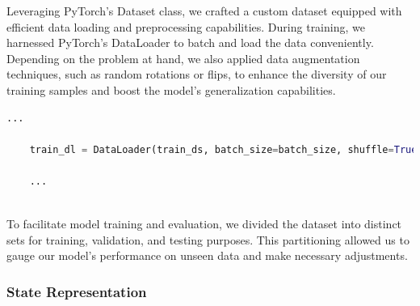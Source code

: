 Leveraging PyTorch's Dataset class, we crafted a custom dataset equipped with efficient data loading and preprocessing capabilities. 
During training, we harnessed PyTorch's DataLoader to batch and load the data conveniently. 
Depending on the problem at hand, we also applied data augmentation techniques, such as random rotations or flips, 
to enhance the diversity of our training samples and boost the model's generalization capabilities.

\begin{lstlisting}[language=Python]
    ...

    train_dl = DataLoader(train_ds, batch_size=batch_size, shuffle=True)

    ...
    
\end{lstlisting}

To facilitate model training and evaluation, we divided the dataset into distinct sets for training, validation, 
and testing purposes. This partitioning allowed us to gauge our model's performance on unseen data and make necessary adjustments.

\subsubsection*{State Representation}

